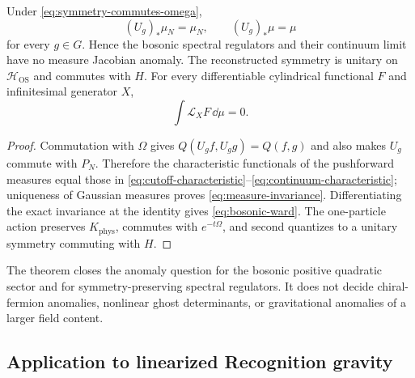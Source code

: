 \begin{theorem}
\label{thm:bosonic-anomaly-free}
Under \eqref{eq:symmetry-commutes-omega},
\begin{equation}
(U_g)_*\mu_N=\mu_N,
\qquad
(U_g)_*\mu=\mu
\label{eq:measure-invariance}
\end{equation}
for every $g\in G$.  Hence the bosonic spectral regulators and their continuum limit have no measure Jacobian anomaly.  The reconstructed symmetry is unitary on $\mathcal H_{\mathrm{OS}}$ and commutes with $H$.  For every differentiable cylindrical functional $F$ and infinitesimal generator $X$,
\begin{equation}
\int \mathcal L_XF\,\dd\mu=0.
\label{eq:bosonic-ward}
\end{equation}
\end{theorem}

\begin{proof}
Commutation with $\Omega$ gives $Q(U_gf,U_gg)=Q(f,g)$ and also makes $U_g$ commute with $P_N$.  Therefore the characteristic functionals of the pushforward measures equal those in \eqref{eq:cutoff-characteristic}--\eqref{eq:continuum-characteristic}; uniqueness of Gaussian measures proves \eqref{eq:measure-invariance}.  Differentiating the exact invariance at the identity gives \eqref{eq:bosonic-ward}.  The one-particle action preserves $K_{\mathrm{phys}}$, commutes with $e^{-t\Omega}$, and second quantizes to a unitary symmetry commuting with $H$.
\end{proof}

\begin{remark}
The theorem closes the anomaly question for the bosonic positive quadratic sector and for symmetry-preserving spectral regulators.  It does not decide chiral-fermion anomalies, nonlinear ghost determinants, or gravitational anomalies of a larger field content.
\end{remark}

\subsection{Application to linearized Recognition gravity}

